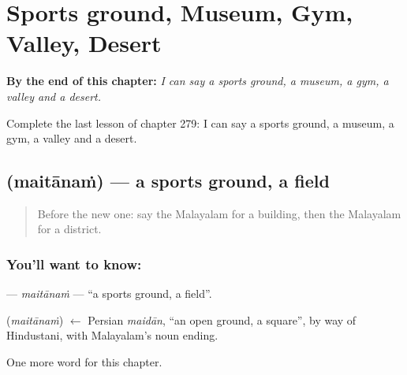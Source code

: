 
\chapter{Sports ground, Museum, Gym, Valley, Desert}
\label{ch:ml-sports-ground-museum-gym-valley-desert}

\begin{chapteropening}
\textbf{By the end of this chapter:} \emph{I can say a sports ground, a museum, a gym, a valley and a desert.}

Complete the last lesson of chapter 279: I can say a sports ground, a museum, a gym, a valley and a desert.
\end{chapteropening}

\section[\texorpdfstring{\ml{മൈതാനം} (maitānaṁ)}{മൈതാനം (maitānaṁ)}]{ (maitānaṁ) — a sports ground, a field}

\label{lesson:ML-C279-maitanam}



\begin{quote}
Before the new one: say the Malayalam for a building, then the Malayalam for a district.
\end{quote}

\subsection*{You'll want to know: }
\textbf{} — \emph{maitānaṁ} — \textquotedblleft{}a sports ground, a field\textquotedblright{}.

\begin{cousinweb}
\textbf{} (\emph{maitānaṁ}) $\leftarrow$ Persian \emph{maidān}, \textquotedblleft{}an open ground, a square\textquotedblright{}, by way of Hindustani, with Malayalam's noun ending.
\end{cousinweb}

\begin{grammarlens}[title={What you've built}]
One more word for this chapter.
\end{grammarlens}

